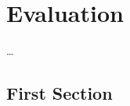 
\chapter{Evaluation}
\label{ch:Evaluation}

\dots

\section{First Section}
\label{sec:Evaluation:FirstSection}
